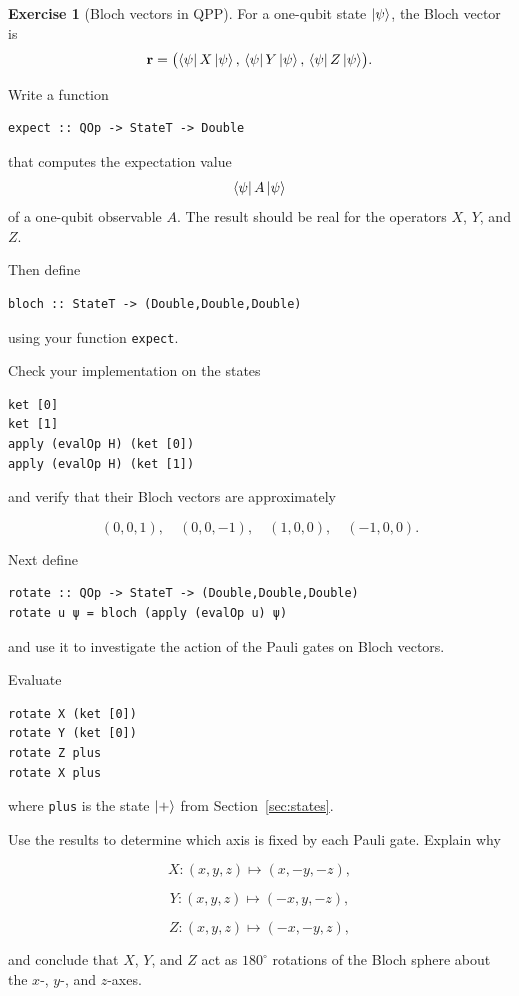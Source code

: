 \documentclass[11pt,a4paper]{article}
\theoremstyle{definition}
\newtheorem{exercise}{Exercise}[section]
\begin{document}
\begin{exercise}[Bloch vectors in QPP]
For a one-qubit state $\left| \psi \right\rangle$, the Bloch vector is
\[
  \mathbf r =
  \bigl(
    \left\langle \psi \right| X\left| \psi \right\rangle,\,
    \left\langle \psi \right| Y\left| \psi \right\rangle,\,
    \left\langle \psi \right| Z\left| \psi \right\rangle
  \bigr).
\]

Write a function

\begin{lstlisting}
expect :: QOp -> StateT -> Double
\end{lstlisting}

that computes the expectation value
\[
  \left\langle \psi \right| A\left| \psi \right\rangle
\]
of a one-qubit observable $A$.  The result should be real for the operators
$X$, $Y$, and $Z$.

Then define

\begin{lstlisting}
bloch :: StateT -> (Double,Double,Double)
\end{lstlisting}

using your function \lstinline|expect|.

Check your implementation on the states

\begin{lstlisting}
ket [0]
ket [1]
apply (evalOp H) (ket [0])
apply (evalOp H) (ket [1])
\end{lstlisting}

and verify that their Bloch vectors are approximately

\[
  (0,0,1),\quad
  (0,0,-1),\quad
  (1,0,0),\quad
  (-1,0,0).
\]

Next define

\begin{lstlisting}
rotate :: QOp -> StateT -> (Double,Double,Double)
rotate u ψ = bloch (apply (evalOp u) ψ)
\end{lstlisting}

and use it to investigate the action of the Pauli gates on Bloch vectors.

Evaluate

\begin{lstlisting}
rotate X (ket [0])
rotate Y (ket [0])
rotate Z plus
rotate X plus
\end{lstlisting}

where \lstinline|plus| is the state $\left| + \right\rangle$ from
Section~\ref{sec:states}.

Use the results to determine which axis is fixed by each Pauli gate.
Explain why

\[
  X:(x,y,z)\mapsto(x,-y,-z),
\]

\[
  Y:(x,y,z)\mapsto(-x,y,-z),
\]

\[
  Z:(x,y,z)\mapsto(-x,-y,z),
\]

and conclude that $X$, $Y$, and $Z$ act as $180^\circ$
rotations of the Bloch sphere about the $x$-, $y$-, and $z$-axes.
\end{exercise}
\end{document}
